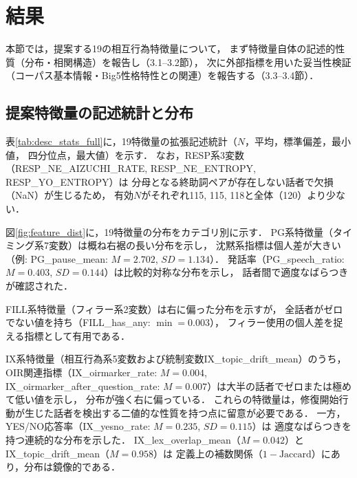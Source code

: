 \documentclass[dvipdfmx,11pt,a4paper]{bxjsarticle}
\begin{document}
\section{結果}

本節では，提案する19の相互行為特徴量について，
まず特徴量自体の記述的性質（分布・相関構造）を報告し（3.1--3.2節），
次に外部指標を用いた妥当性検証（コーパス基本情報・Big5性格特性との関連）を報告する（3.3--3.4節）．

\subsection{提案特徴量の記述統計と分布}
\label{sec:result_descriptive}

表\ref{tab:desc_stats_full}に，19特徴量の拡張記述統計（$N$，平均，標準偏差，最小値，
四分位点，最大値）を示す．
なお，RESP系3変数（RESP\_NE\_AIZUCHI\_RATE, RESP\_NE\_ENTROPY, RESP\_YO\_ENTROPY）は
分母となる終助詞ペアが存在しない話者で欠損（NaN）が生じるため，
有効$N$がそれぞれ115, 115, 118と全体（120）より少ない．

\begin{table}[htbp]
\centering
\caption{19特徴量の拡張記述統計}
\label{tab:desc_stats_full}

\end{table}

図\ref{fig:feature_dist}に，19特徴量の分布をカテゴリ別に示す．
PG系特徴量（タイミング系7変数）は概ね右裾の長い分布を示し，
沈黙系指標は個人差が大きい（例: PG\_pause\_mean: $M = 2.702$, $SD = 1.134$）．
発話率（PG\_speech\_ratio: $M = 0.403$, $SD = 0.144$）は比較的対称な分布を示し，
話者間で適度なばらつきが確認された．

FILL系特徴量（フィラー系2変数）は右に偏った分布を示すが，
全話者がゼロでない値を持ち（FILL\_has\_any: $\min = 0.003$），
フィラー使用の個人差を捉える指標として有用である．

IX系特徴量（相互行為系5変数および統制変数IX\_topic\_drift\_mean）のうち，OIR関連指標（IX\_oirmarker\_rate: $M = 0.004$,
IX\_oirmarker\_after\_question\_rate: $M = 0.007$）は大半の話者でゼロまたは極めて低い値を示し，
分布が強く右に偏っている．
これらの特徴量は，修復開始行動が生じた話者を検出する二値的な性質を持つ点に留意が必要である．
一方，YES/NO応答率（IX\_yesno\_rate: $M = 0.235$, $SD = 0.115$）は
適度なばらつきを持つ連続的な分布を示した．
IX\_lex\_overlap\_mean（$M = 0.042$）とIX\_topic\_drift\_mean（$M = 0.958$）は
定義上の補数関係（$1 - \text{Jaccard}$）にあり，分布は鏡像的である．
\end{document}
